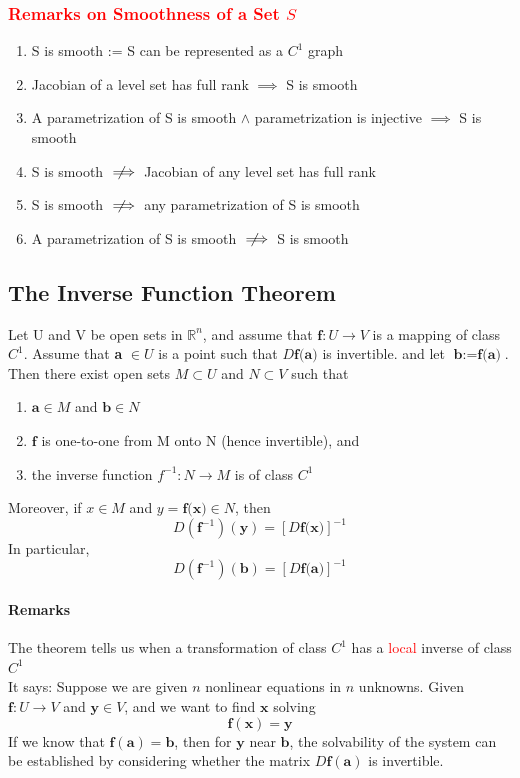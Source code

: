 \documentclass[11pt]{article}
\newcommand{\tb}[1]{\textbf{#1}}
\newcommand{\real}[0]{\mathbb{R}}
\newcommand{\func}[3]{\tb{#1}: {#2} \rightarrow {#3} }
\newcommand{\vx}[0]{\tb{x}}
\newcommand{\vy}[0]{\tb{y}}
\newcommand{\va}[0]{\tb{a}}
\newcommand{\vb}[0]{\tb{b}}
\newcommand{\ff}[0]{\tb{f}}
\newcommand{\notimplies}{%
  \mathrel{{\ooalign{\hidewidth$\not\phantom{=}$\hidewidth\cr$\implies$}}}}
\begin{document}
\subsubsection{\textcolor{red}{Remarks on Smoothness of a Set $S$}}
\begin{enumerate}
	\item S is smooth := S can be represented as a $C^1$ graph
	\item Jacobian of a level set has full rank $\implies$ S is smooth
	\item A parametrization of S is smooth $\wedge$ parametrization is injective $\implies$ S is smooth
	\item S is smooth $\notimplies$ Jacobian of any level set has full rank
	\item S is smooth $\notimplies$ any parametrization of S is smooth
	\item A parametrization of S is smooth $\notimplies$ S is smooth
\end{enumerate}


\subsection{The Inverse Function Theorem} Let U and V be open sets in $\real^n$, and assume that $\func{f}{U}{V}$ is a mapping of class $C^1$. \newline
Assume that \tb{a} $\in U$ is a point such that $D\tb{f(a)}$ is invertible. \newline
and let $\tb{b} := \tb{f(a)}$. Then there exist open sets $M \subset U$ and $N \subset V$ such that
\begin{enumerate}
    \item $\tb{a} \in M$ and $\tb{b} \in N$
    \item $\tb{f}$ is one-to-one from M onto N (hence invertible), and
    \item the inverse function $f^{-1}: N \rightarrow M$ is of class $C^1$
\end{enumerate}
Moreover, if $x \in M$ and $y = \tb{f(x)}\in N$, then $$D(\tb{f}^{-1})(\tb{y}) = [D\tb{f(x)}]^{-1}$$
In particular, $$D(\tb{f}^{-1})(\tb{b}) = [D\tb{f(a)}]^{-1}$$
\paragraph{Remarks} The theorem tells us when a transformation of class $C^1$ has a \textcolor{red}{local} inverse of class $C^1$\\
It says: Suppose we are given $n$ nonlinear equations in $n$ unknowns. Given $\ff: U \rightarrow V$ and $\vy \in V$, and we want to find $\vx$ solving
$$\ff(\vx) = \vy$$
If we know that $\ff(\va) = \vb$, then for $\vy$ near $\vb$, the solvability of the system can be established by considering whether the matrix $D\ff(\va)$ is invertible.
\end{document}
